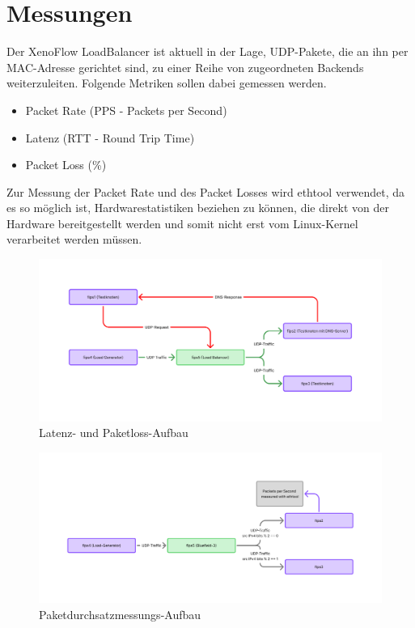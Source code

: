 \section{Messungen}
Der XenoFlow LoadBalancer ist aktuell in der Lage, UDP-Pakete, die an ihn per MAC-Adresse gerichtet sind, zu einer Reihe von zugeordneten Backends weiterzuleiten. Folgende Metriken sollen dabei gemessen werden. 
\begin{itemize}
    \item Packet Rate (PPS - Packets per Second)
    \item Latenz (RTT - Round Trip Time)
    \item Packet Loss (\%)
\end{itemize}
Zur Messung der Packet Rate und des Packet Losses wird ethtool verwendet, da es so möglich ist, Hardwarestatistiken beziehen zu können, die direkt von der Hardware bereitgestellt werden und somit nicht erst vom Linux-Kernel verarbeitet werden müssen.
\begin{figure}
    \centering
    \includegraphics[width=1\linewidth]{images/Messaufbau Latenz(1).png}
    \caption{Latenz- und Paketloss-Aufbau}
    \label{fig:enter-label}
\end{figure}
\begin{figure}
    \centering
    \includegraphics[width=1\linewidth]{images/Messaufbau PPS(1).png}
    \caption{Paketdurchsatzmessungs-Aufbau}
    \label{fig:enter-label}
\end{figure}
